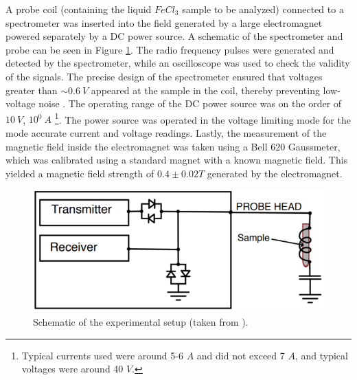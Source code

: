 \documentclass[a4paper, 12pt]{article}  %
\begin{document}
 A probe coil (containing the liquid $FeCl_3$ sample to be analyzed) connected to a spectrometer was inserted into the field generated by a large electromagnet powered separately by a DC power source. A schematic of the spectrometer and probe can be seen in Figure \ref{fig:schematic}. The radio frequency pulses were generated and detected by the spectrometer, while an oscilloscope was used to check the validity of the signals. The precise design of the spectrometer ensured that voltages greater than $\sim 0.6 \ V$ appeared at the sample in the coil, thereby preventing low-voltage noise \cite{Lab Manual}. The operating range of the DC power source was on the order of $10 \ V$, $10^0 \ A$ \footnote{Typical currents used were around 5-6 $A$ and did not exceed 7 $A$, and typical voltages were around 40 $V$.}. The power source was operated in the voltage limiting mode for the mode accurate current and voltage readings. Lastly, the measurement of the magnetic field inside the electromagnet was taken using a Bell 620 Gaussmeter, which was calibrated using a standard magnet with a known magnetic field. This yielded a magnetic field strength of $0.4 \pm 0.02 T$ generated by the electromagnet. 
 
 \begin{figure}[htb]
     \centering
     \includegraphics[scale=0.75]{schematic.PNG}
     \caption{Schematic of the experimental setup (taken from \cite{Lab Manual}).}
     \label{fig:schematic}
 \end{figure}





\end{document}
